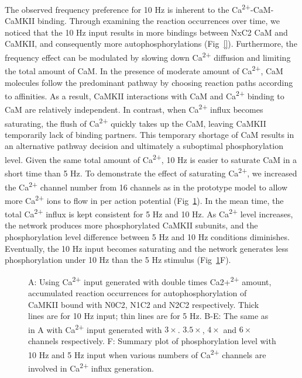 \documentclass[10pt,letterpaper]{article}
\begin{document}
The observed frequency preference for 10 Hz is inherent to the Ca\textsuperscript{2+}-CaM-CaMKII binding. Through examining the reaction occurrences over time, we noticed that the 10 Hz input results in more bindings between NxC2 CaM and CaMKII, and consequently more autophosphorylations (Fig~\ref{}). Furthermore, the frequency effect can be modulated by slowing down Ca\textsuperscript{2+} diffusion and limiting the total amount of CaM. In the presence of moderate amount of Ca\textsuperscript{2+}, CaM molecules follow the predominant pathway by choosing reaction paths according to affinities. As a result, CaMKII interactions with CaM and Ca\textsuperscript{2+} binding to CaM are relatively independent. In contrast, when Ca\textsuperscript{2+} influx becomes saturating, the flush of Ca\textsuperscript{2+} quickly takes up the CaM, leaving CaMKII temporarily lack of binding partners. This temporary shortage of CaM results in an alternative pathway decision and ultimately a suboptimal phosphorylation level. Given the same total amount of Ca\textsuperscript{2+}, 10 Hz is easier to saturate CaM in a short time than 5 Hz. To demonstrate the effect of saturating Ca\textsuperscript{2+}, we increased the Ca\textsuperscript{2+} channel number from 16 channels as in the prototype model to allow more Ca\textsuperscript{2+} ions to flow in per action potential (Fig~\ref{fig5}). In the mean time, the total Ca\textsuperscript{2+} influx is kept consistent for 5 Hz and 10 Hz. As Ca\textsuperscript{2+} level increases, the network produces more phosphorylated CaMKII subunits, and the phosphorylation level difference between 5 Hz and 10 Hz conditions diminishes. Eventually, the 10 Hz input becomes saturating and the network generates less phosphorylation under 10 Hz than the 5 Hz stimulus (Fig~\ref{fig5}F). 

\begin{figure}[!h]
	\caption{{\bf}
	A: Using Ca\textsuperscript{2+} input generated with double times Ca2+\textsuperscript{2+} amount, accumulated reaction occurrences for autophosphorylation of CaMKII bound with N0C2, N1C2 and N2C2 respectively. Thick lines are for 10 Hz input; thin lines are for 5 Hz. B-E: The same as in A with Ca\textsuperscript{2+} input generated with $3\times$. $3.5\times$, $4\times$ and $6\times$ channels respectively. F: Summary plot of phosphorylation level with 10 Hz and 5 Hz input when various numbers of Ca\textsuperscript{2+} channels are involved in Ca\textsuperscript{2+} influx generation.}
\label{fig5}
\end{figure}
\end{document}
